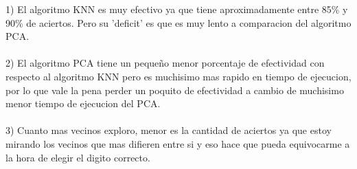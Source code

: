 
1) El algoritmo KNN es muy efectivo ya que tiene aproximadamente entre 85\% y 90\% de aciertos. Pero su 'deficit' es que es muy lento a comparacion del algoritmo PCA.\\ 
\\
2) El algoritmo PCA tiene un pequeño menor porcentaje de efectividad con respecto al algoritmo KNN pero es muchisimo mas rapido en tiempo de ejecucion, por lo que vale la pena perder un poquito de efectividad a cambio de muchisimo menor tiempo de ejecucion del PCA.\\ \\
3) Cuanto mas vecinos exploro, menor es la cantidad de aciertos ya que estoy mirando los vecinos que mas difieren entre si y eso hace que pueda equivocarme a la hora de elegir el digito correcto. 
\\ \\